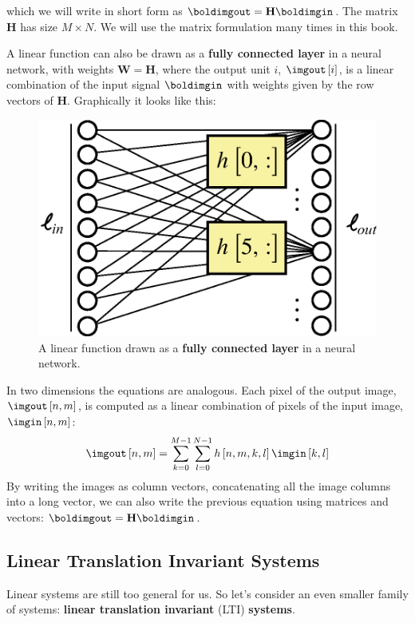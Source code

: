 which we will write in short form as $\boldimgout =  \mathbf{H} \boldimgin$.
The matrix $\mathbf{H}$ has size $M \times N$.%
We will use the matrix formulation many times in this book.

A linear function can also be drawn as a {\bf fully connected layer} in a neural network, with weights $\mathbf{W} = \mathbf{H}$, where the output unit $i$, $\imgout \left[i \right]$, is a linear combination of the input signal $\boldimgin$ with weights given by the row vectors of $\mathbf{H}$. Graphically it looks like this:

\begin{figure}[h!]
	\centerline{
		\includegraphics[width=.4\linewidth]{figures/linear_image_filtering/linear_filter.eps}
	}
	\caption{A linear function drawn as a {\bf fully connected layer} in a neural network.}
\end{figure}

In two dimensions the equations are analogous. Each pixel of the output
image, $\imgout \left[n,m\right]$, is computed as a linear combination of pixels of the input image, $\imgin \left[n, m\right]$:
\begin{equation}
	\imgout \left[n,m \right] = \sum_{k=0}^{M-1} \sum_{l=0}^{N-1} h \left[n,m,k,l \right] \imgin \left[k,l \right]
	\label{eq:lin}
\end{equation}
By writing the images as column vectors, concatenating all the image columns into a long vector, we can also write the previous equation using matrices and vectors: $\boldimgout =  \mathbf{H} \boldimgin$.

\subsection{Linear Translation Invariant Systems}



Linear systems are still too general for us. So let's consider an even smaller family of systems: {\bf linear translation invariant} (LTI) {\bf systems}.


